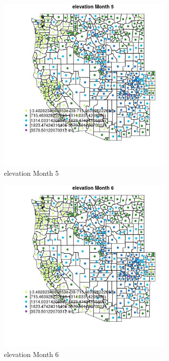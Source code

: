 \begin{figure} 
\centering  
\includegraphics[width=0.77\textwidth]{Code_Outputs/df_report_ML_predictors_CountyCentroid_Locations_Dates_2008-01-01to2018-12-31_MapObsMo5elevation.jpg} 
\caption{\label{fig:df_report_ML_predictors_CountyCentroid_Locations_Dates_2008-01-01to2018-12-31MapObsMo5elevation}elevation Month 5} 
\end{figure} 
 

\clearpage 

\begin{figure} 
\centering  
\includegraphics[width=0.77\textwidth]{Code_Outputs/df_report_ML_predictors_CountyCentroid_Locations_Dates_2008-01-01to2018-12-31_MapObsMo6elevation.jpg} 
\caption{\label{fig:df_report_ML_predictors_CountyCentroid_Locations_Dates_2008-01-01to2018-12-31MapObsMo6elevation}elevation Month 6} 
\end{figure} 
 

